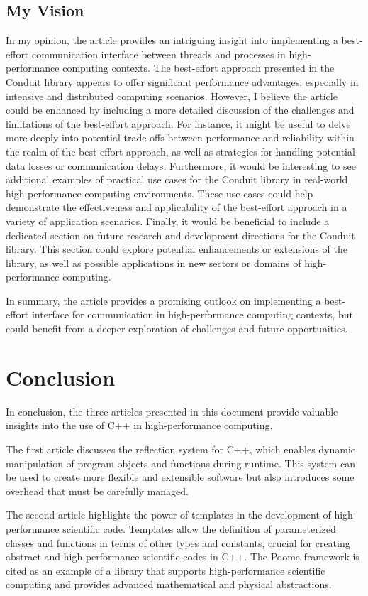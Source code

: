 \documentclass[11pt]{article}
\begin{document}
\begin{multicols*}{2}[\columnsep=1cm]
    \subsection{My Vision}
    In my opinion, the article provides an intriguing insight into implementing a best-effort communication interface between threads and processes in high-performance computing contexts. The best-effort approach presented in the Conduit library appears to offer significant performance advantages, especially in intensive and distributed computing scenarios.
    However, I believe the article could be enhanced by including a more detailed discussion of the challenges and limitations of the best-effort approach. For instance, it might be useful to delve more deeply into potential trade-offs between performance and reliability within the realm of the best-effort approach, as well as strategies for handling potential data losses or communication delays.
    Furthermore, it would be interesting to see additional examples of practical use cases for the Conduit library in real-world high-performance computing environments. These use cases could help demonstrate the effectiveness and applicability of the best-effort approach in a variety of application scenarios.
    Finally, it would be beneficial to include a dedicated section on future research and development directions for the Conduit library. This section could explore potential enhancements or extensions of the library, as well as possible applications in new sectors or domains of high-performance computing.
    
    In summary, the article provides a promising outlook on implementing a best-effort interface for communication in high-performance computing contexts, but could benefit from a deeper exploration of challenges and future opportunities.
\section{Conclusion}
In conclusion, the three articles presented in this document provide valuable insights into the use of C++ in high-performance computing.

The first article discusses the reflection system for C++, which enables dynamic manipulation of program objects and functions during runtime. This system can be used to create more flexible and extensible software but also introduces some overhead that must be carefully managed.

The second article highlights the power of templates in the development of high-performance scientific code. Templates allow the definition of parameterized classes and functions in terms of other types and constants, crucial for creating abstract and high-performance scientific codes in C++. The Pooma framework is cited as an example of a library that supports high-performance scientific computing and provides advanced mathematical and physical abstractions.


\end{multicols*}
\end{document}
